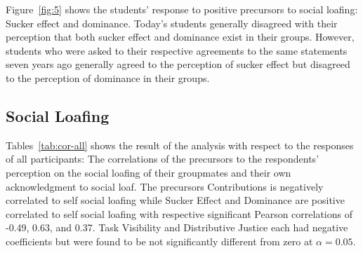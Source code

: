 \documentclass[a4paper,a4paper,BCOR12mm,12pt,abstracton,pointednumbers,tablecaptionabove,footinclude,halfparskip,normalheadings,]{scrartcl}
\begin{document}
\begin{figure*}[hbt]
\centering{}
\caption{The respondents agreement to negative precursors to social loafing: (a)~Task visibility, (b)~contributions, and (c)~distributive justice. The data from seven years ago came from~\citet{Pabico08}.}\label{fig:4}
\end{figure*}

Figure~\ref{fig:5} shows the students' response to positive precursors to social loafing: Sucker effect and dominance. Today's students generally disagreed with their perception that both sucker effect and dominance exist in their groups. However, students who were asked to their respective agreements to the same statements seven years ago generally agreed to the perception of sucker effect but disagreed to the perception of dominance in their groups.

\begin{figure*}[hbt]
\centering{}
\caption{The respondents agreement to positive precursors to social loafing: (a)~Sucker effect, and (b)~dominance and agression. The data from seven years ago came from~\citet{Pabico08}.}\label{fig:5}
\end{figure*}

\subsection{Social Loafing}

Tables~\ref{tab:cor-all} shows the result of the analysis with respect to the responses of all participants: The correlations of the precursors to the respondents' perception on the social loafing of their groupmates and their own acknowledgment to social loaf. The precursors Contributions is negatively correlated to self social loafing while Sucker Effect and Dominance are positive correlated to self social loafing with respective significant Pearson correlations of -0.49, 0.63, and 0.37. Task Visibility and Distributive Justice each had negative coefficients but were found to be not significantly different from zero at $\alpha=0.05$.
\end{document}

